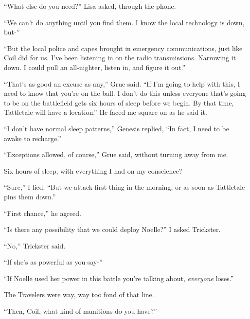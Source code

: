 ``What else do you need?'' Lisa asked, through the phone.



``We can't do anything until you find them.  I know the local technology is down, but-''



``But the local police and capes brought in emergency communications, just like Coil did for us.  I've been listening in on the radio transmissions.  Narrowing it down.  I could pull an all-nighter, listen in, and figure it out.''



``That's as good an excuse as any,'' Grue said.  ``If I'm going to help with this, I need to know that you're on the ball.  I don't do this unless everyone that's going to be on the battlefield gets six hours of sleep before we begin.  By that time, Tattletale will have a location.''  He faced me square on as he said it.



``I don't have normal sleep patterns,'' Genesis replied, ``In fact, I need to be awake to recharge.''



``Exceptions allowed, of course,'' Grue said, without turning away from me.



Six hours of sleep, with everything I had on my conscience?



``Sure,'' I lied.  ``But we attack first thing in the morning, or as soon as Tattletale pins them down.''



``First chance,'' he agreed.



``Is there any possibility that we could deploy Noelle?''  I asked Trickster.



``No,'' Trickster said.



``If she's as powerful as you say-''



``If Noelle used her power in this battle you're talking about, \emph{everyone} loses.''



The Travelers were way, way too fond of that line.



``Then, Coil, what kind of munitions do you have?''



